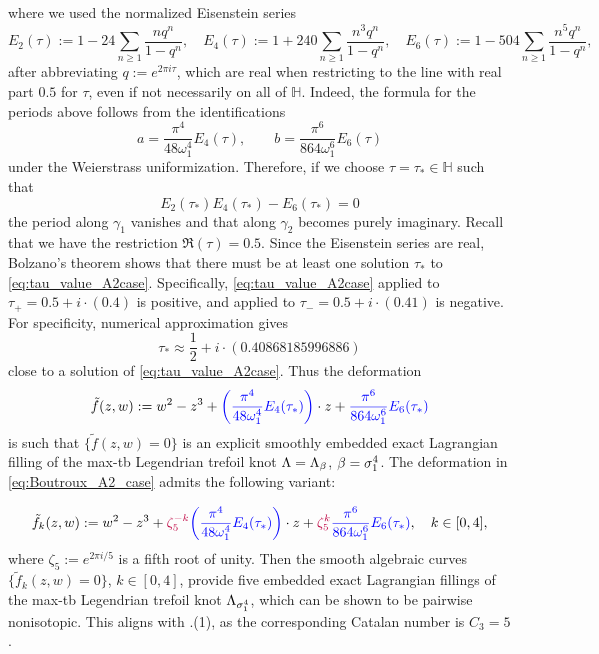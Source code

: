 \begin{example}
\noindent where we used the normalized Eisenstein series
$$E_2(\tau):=1-24\sum_{n\geq1}\frac{nq^n}{1-q^n},\quad 
 E_4(\tau)
 :=1+240\sum_{n\geq1}\frac{n^3q^n}{1-q^n},\quad E_6(\tau)
 :=1-504\sum_{n\geq1}\frac{n^5q^n}{1-q^n},$$
after abbreviating $q:=e^{2\pi i\tau}$, which are real when restricting to the line with real part $0.5$ for $\tau$, even if not necessarily on all of $\mathbb{H}$. Indeed, the formula for the periods above follows from the identifications
\begin{equation}\label{eq:a_b_tau_value_A2case}
a = \frac{\pi^4}{48\omega_1^4} E_4(\tau), \qquad b = \frac{\pi^6}{864\omega_1^6} E_6(\tau)
\end{equation}
under the Weierstrass uniformization. Therefore, if we choose $\tau=\tau_\ast\in\mathbb{H}$ such that
\begin{equation}\label{eq:tau_value_A2case}
E_2(\tau_\ast)E_4(\tau_\ast)-E_6(\tau_\ast)=0
\end{equation}
the period along $\gamma_1$ vanishes and that along $\gamma_2$ becomes purely imaginary. Recall that we have the restriction $\Re(\tau)=0.5$. Since the Eisenstein series are real, Bolzano's theorem shows that there must be at least one solution $\tau_\ast$ to \eqref{eq:tau_value_A2case}. Specifically, \eqref{eq:tau_value_A2case} applied to $\tau_+=0.5+i\cdot(0.4)$ is positive, and applied to $\tau_-=0.5+i\cdot(0.41)$ is negative. For specificity, numerical approximation gives
$$\tau_\ast\approx\frac{1}{2}+i\cdot(0.40868185996886)$$
close to a solution of \eqref{eq:tau_value_A2case}. Thus the deformation
\begin{equation}\label{eq:Boutroux_A2_case}
\tilde{f}(z,w):=w^2-z^3+\textcolor{blue}{\left(\frac{\pi^4}{48\omega_1^4} E_4(\tau_\ast)\right)}\cdot z+\textcolor{blue}{\frac{\pi^6}{864\omega_1^6} E_6(\tau_\ast)}
\end{equation}
is such that $\{\tilde{f}(z,w)=0\}$ is an explicit smoothly embedded exact Lagrangian filling of the max-tb Legendrian trefoil knot $\Lambda=\Lambda_\beta$, $\beta=\sigma_1^4$. The deformation in \eqref{eq:Boutroux_A2_case} admits the following variant:

\begin{equation}\label{eq:Boutroux_A2_case_5symmetry}
\tilde{f}_k(z,w):=w^2-z^3+\textcolor{purple}{\zeta_5^{-k}}\textcolor{blue}{\left(\frac{\pi^4}{48\omega_1^4} E_4(\tau_\ast)\right)}\cdot z+\textcolor{purple}{\zeta_5^{k}}\textcolor{blue}{\frac{\pi^6}{864\omega_1^6} E_6(\tau_\ast)},\quad k\in[0,4],
\end{equation}
where $\zeta_5:=e^{2\pi i/5}$ is a fifth root of unity. Then the smooth algebraic curves $\{\tilde{f}_k(z,w)=0\}$, $k\in[0,4]$, provide five embedded exact Lagrangian fillings of the max-tb Legendrian trefoil knot $\Lambda_{\sigma_1^4}$, which can be shown to be pairwise nonisotopic. This aligns with .(1), as the corresponding Catalan number is $C_3=5$.\\


\end{example}
